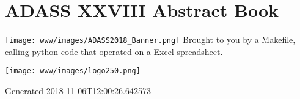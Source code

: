 \documentclass{report}
\begin{document}
              \chapter*{ADASS XXVIII Abstract Book}              
              \texttt{[image: www/images/ADASS2018\_Banner.png]}
              Brought to you by a Makefile, calling python code that operated on a Excel spreadsheet.
              \newline\newline
              \bigskip\bigskip
              \begin{center}
              \texttt{[image: www/images/logo250.png]}
              \end{center}
              \bigskip
           Generated 2018-11-06T12:00:26.642573\newpage
\end{document}
